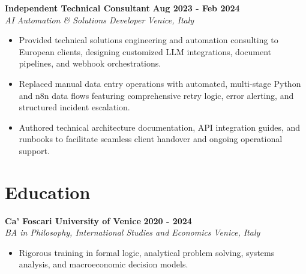\documentclass[10pt,a4paper]{article}
\newcommand{\role}[4]{%
  \textbf{#1} \hfill \textbf{#2}\\[1pt]%
  \textit{#3} \hfill \textit{#4}\\[2pt]%
}
\begin{document}
\role{Independent Technical Consultant}{Aug 2023 - Feb 2024}{AI Automation \& Solutions Developer}{Venice, Italy}
\begin{itemize}
  \item Provided technical solutions engineering and automation consulting to European clients, designing customized LLM integrations, document pipelines, and webhook orchestrations.
  \item Replaced manual data entry operations with automated, multi-stage Python and n8n data flows featuring comprehensive retry logic, error alerting, and structured incident escalation.
  \item Authored technical architecture documentation, API integration guides, and runbooks to facilitate seamless client handover and ongoing operational support.
\end{itemize}

\section{Education}
\role{Ca' Foscari University of Venice}{2020 - 2024}{BA in Philosophy, International Studies and Economics}{Venice, Italy}
\begin{itemize}
  \item Rigorous training in formal logic, analytical problem solving, systems analysis, and macroeconomic decision models.
\end{itemize}
\end{document}

